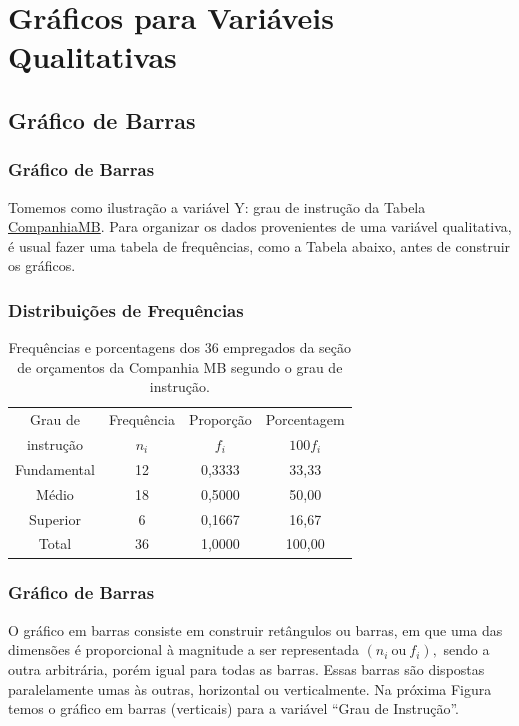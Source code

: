 \documentclass[14pt,aspectratio=1610]{beamer}
\begin{document}
\section{Gráficos para Variáveis Qualitativas}
\subsection{Gráfico de Barras}
\begin{frame}{}
\frametitle{Gráfico de Barras}
\begin{block}{}
\justifying
Tomemos como ilustração a variável Y: grau de instrução da Tabela \href{https://raw.githack.com/ufvest/ufvest.github.io/master/Aulas_EST105/CompanhiaMB.html}{CompanhiaMB}. Para organizar os dados provenientes de uma variável qualitativa, é usual fazer uma tabela de frequências, como a Tabela abaixo, antes de construir os gráficos.
\end{block}
\end{frame}

\begin{frame}{}
\frametitle{Distribuições de Frequências}
\vspace{-0.5cm}
\begin{block}{}
\justifying
\begin{table}[H]
\caption{Frequências e porcentagens dos 36 empregados da seção de orçamentos da Companhia MB segundo o grau de instrução.}
\label{tab2}
\begin{tabular}{c|c|c|c}
\hline
Grau de   &Frequência&Proporção&Porcentagem\\
instrução &$n_{i}$   &$f_{i}$  &$100f_{i}$ \\
\hline
Fundamental&12       &0,3333   &33,33      \\
Médio      &18       &0,5000   &50,00      \\
Superior   & 6       &0,1667   &16,67      \\
\hline
Total      &36       &1,0000   &100,00     \\
\hline
\end{tabular}
\end{table}
\end{block}
\end{frame}

\begin{frame}{}
\frametitle{Gráfico de Barras}
\begin{block}{}
\justifying
O gráfico em barras consiste em construir retângulos ou barras, em que uma das dimensões é proporcional à magnitude a ser representada $(n_{i}\ \textrm{ou}\ f_{i}),$ sendo a outra arbitrária, porém igual para todas as barras. Essas barras são dispostas paralelamente umas às outras, horizontal ou verticalmente. Na próxima Figura temos o gráfico em barras (verticais) para a variável ``Grau de Instrução''.
\end{block}
\end{frame}
\end{document}
